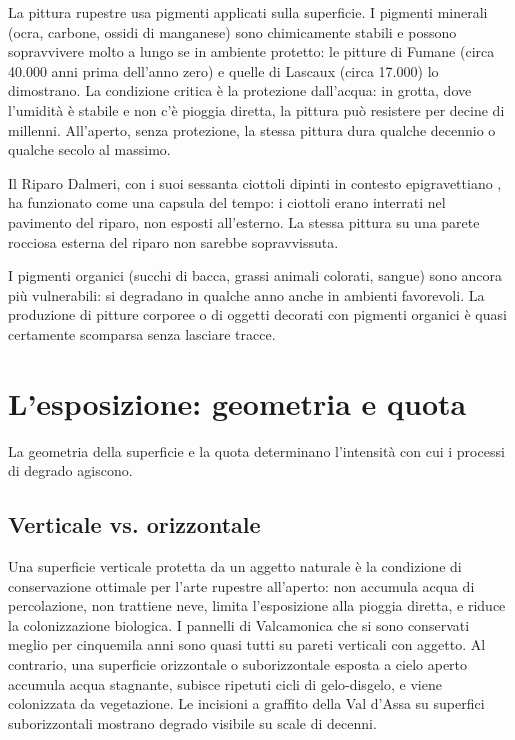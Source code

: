 La pittura rupestre usa pigmenti applicati sulla superficie. I pigmenti minerali (ocra, carbone, ossidi di manganese) sono chimicamente stabili e possono sopravvivere molto a lungo se in ambiente protetto: le pitture di Fumane (circa 40.000 anni prima dell'anno zero) \citep{broglio2003} e quelle di Lascaux (circa 17.000) \citep{leroi_gourhan1965} lo dimostrano. La condizione critica è la protezione dall'acqua: in grotta, dove l'umidità è stabile e non c'è pioggia diretta, la pittura può resistere per decine di millenni. All'aperto, senza protezione, la stessa pittura dura qualche decennio o qualche secolo al massimo.

Il Riparo Dalmeri, con i suoi sessanta ciottoli dipinti in contesto epigravettiano \citep{dalmeri2002}, ha funzionato come una capsula del tempo: i ciottoli erano interrati nel pavimento del riparo, non esposti all'esterno. La stessa pittura su una parete rocciosa esterna del riparo non sarebbe sopravvissuta.

I pigmenti organici (succhi di bacca, grassi animali colorati, sangue) sono ancora più vulnerabili: si degradano in qualche anno anche in ambienti favorevoli. La produzione di pitture corporee o di oggetti decorati con pigmenti organici è quasi certamente scomparsa senza lasciare tracce.

\section{L'esposizione: geometria e quota}

La geometria della superficie e la quota determinano l'intensità con cui i processi di degrado agiscono.

\subsection{Verticale vs. orizzontale}

Una superficie verticale protetta da un aggetto naturale è la condizione di conservazione ottimale per l'arte rupestre all'aperto: non accumula acqua di percolazione, non trattiene neve, limita l'esposizione alla pioggia diretta, e riduce la colonizzazione biologica. I pannelli di Valcamonica che si sono conservati meglio per cinquemila anni sono quasi tutti su pareti verticali con aggetto. Al contrario, una superficie orizzontale o suborizzontale esposta a cielo aperto accumula acqua stagnante, subisce ripetuti cicli di gelo-disgelo, e viene colonizzata da vegetazione. Le incisioni a graffito della Val d'Assa su superfici suborizzontali mostrano degrado visibile su scale di decenni.

